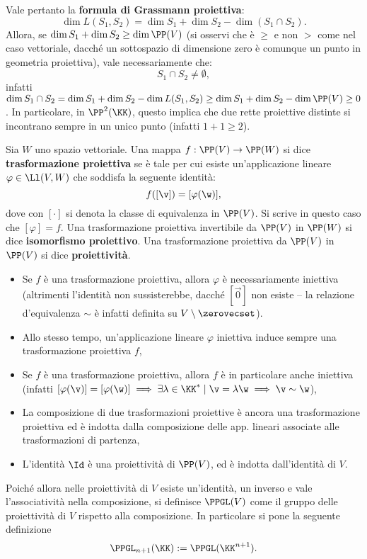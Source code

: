 \documentclass[10pt,landscape]{article}
\begin{document}
\begin{multicols}{3}
		
		Vale pertanto la \textbf{formula di Grassmann proiettiva}:
		\[ \dim L(S_1, S_2) = \dim S_1 + \dim S_2 - \dim (S_1 \cap S_2). \]
		Allora, se $\dim S_1 + \dim S_2 \geq \dim \PP(V)$ (si osservi che è
		$\geq$ e non $>$ come nel caso vettoriale, dacché un sottospazio di dimensione
		zero è comunque un punto in geometria proiettiva), vale necessariamente
		che:
		\[ S_1 \cap S_2 \neq \emptyset, \]
		infatti $\dim S_1 \cap S_2 = \dim S_1 + \dim S_2 - \dim L(S_1, S_2) \geq
		\dim S_1 + \dim S_2 - \dim \PP(V) \geq 0$. In particolare, in $\PP^2(\KK)$,
		questo implica che due rette proiettive distinte si incontrano sempre in un unico
		punto (infatti $1+1\geq2$).
		
		Sia $W$ uno spazio vettoriale. Una mappa $f : \PP(V) \to \PP(W)$ si dice
		\textbf{trasformazione proiettiva} se è tale per cui esiste un'applicazione
		lineare $\varphi \in \Ll(V, W)$ che soddisfa la seguente identità:
		\[ f([\v]) = [\varphi(\w)], \]
		dove con $[\cdot]$ si denota la classe di equivalenza in $\PP(V)$. Si scrive
		in questo caso che $[\varphi] = f$.
		Una trasformazione proiettiva invertibile da $\PP(V)$ in $\PP(W)$
		si dice \textbf{isomorfismo proiettivo}. Una
		trasformazione proiettiva da $\PP(V)$ in $\PP(V)$ si dice
		\textbf{proiettività}.
		
		\begin{itemize}
			\item Se $f$ è una trasformazione proiettiva, allora $\varphi$ è necessariamente
				iniettiva (altrimenti l'identità non sussisterebbe, dacché $[\vec 0]$ non
				esiste -- la relazione d'equivalenza $\sim$ è infatti definita su $V \setminus
				\zerovecset$).
			\item Allo stesso tempo, un'applicazione lineare $\varphi$ iniettiva induce
				sempre una trasformazione proiettiva $f$,
			\item Se $f$ è una trasformazione proiettiva, allora $f$ è in particolare anche
				iniettiva (infatti $[\varphi(\v)] = [\varphi(\w)] \implies \exists \lambda \in \KK^* \mid \v = \lambda \w \implies \v \sim \w$),
			\item La composizione di due trasformazioni proiettive è ancora una
				trasformazione proiettiva ed è indotta dalla composizione delle app.
				lineari associate alle trasformazioni di partenza,
			\item L'identità $\Id$ è una proiettività di $\PP(V)$, ed è indotta
				dall'identità di $V$.
		\end{itemize}
		
		Poiché allora nelle proiettività di $V$ esiste un'identità, un inverso e vale
		l'associatività nella composizione, si definisce $\PPGL(V)$ come il gruppo delle
		proiettività di $V$ rispetto alla composizione. In particolare si pone la
		seguente definizione
		\[ \PPGL_{n+1}(\KK) := \PPGL(\KK^{n+1}). \]
		

\end{multicols}
\end{document}
